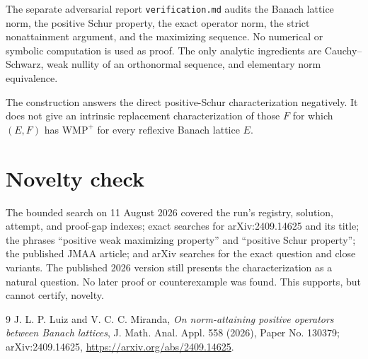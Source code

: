 \documentclass[11pt]{article}
\newcommand{\WMP}{\mathrm{WMP}^{+}}
\begin{document}
The separate adversarial report \texttt{verification.md} audits the Banach
lattice norm, the positive Schur property, the exact operator norm, the strict
nonattainment argument, and the maximizing sequence. No numerical or symbolic
computation is used as proof. The only analytic ingredients are
Cauchy--Schwarz, weak nullity of an orthonormal sequence, and elementary norm
equivalence.

The construction answers the direct positive-Schur characterization
negatively. It does not give an intrinsic replacement characterization of
those $F$ for which $(E,F)$ has $\WMP$ for every reflexive Banach lattice
$E$.

\section{Novelty check}

The bounded search on 11 August 2026 covered the run's registry, solution,
attempt, and proof-gap indexes; exact searches for arXiv:2409.14625 and its
title; the phrases ``positive weak maximizing property'' and ``positive Schur
property''; the published JMAA article; and arXiv searches for the exact
question and close variants. The published 2026 version still presents the
characterization as a natural question. No later proof or counterexample was
found. This supports, but cannot certify, novelty.

\begin{thebibliography}{9}
J. L. P. Luiz and V. C. C. Miranda,
\emph{On norm-attaining positive operators between Banach lattices},
J. Math. Anal. Appl. 558 (2026), Paper No. 130379;
arXiv:2409.14625,
\url{https://arxiv.org/abs/2409.14625}.
\end{thebibliography}
\end{document}
